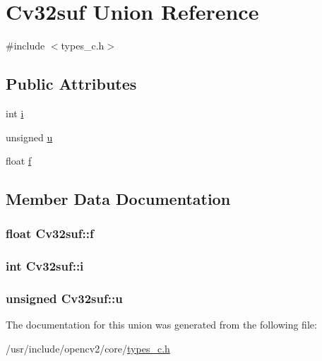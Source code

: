 \hypertarget{unionCv32suf}{\section{Cv32suf Union Reference}
\label{unionCv32suf}
}


{\ttfamily \#include $<$types\-\_\-c.\-h$>$}

\subsection*{Public Attributes}
\begin{DoxyCompactItemize}
\item 
int \hyperlink{unionCv32suf_a424508ebe407f2e67376ddfca524d16f}{i}
\item 
unsigned \hyperlink{unionCv32suf_a37ce47860a0ae3d46f607bd47bc28007}{u}
\item 
float \hyperlink{unionCv32suf_a89f398e11fc2af45eb6553e8b0a0fd18}{f}
\end{DoxyCompactItemize}


\subsection{Member Data Documentation}
\hypertarget{unionCv32suf_a89f398e11fc2af45eb6553e8b0a0fd18}{
\subsubsection[{f}]{\setlength{\rightskip}{0pt plus 5cm}float Cv32suf\-::f}}\label{unionCv32suf_a89f398e11fc2af45eb6553e8b0a0fd18}
\hypertarget{unionCv32suf_a424508ebe407f2e67376ddfca524d16f}{
\subsubsection[{i}]{\setlength{\rightskip}{0pt plus 5cm}int Cv32suf\-::i}}\label{unionCv32suf_a424508ebe407f2e67376ddfca524d16f}
\hypertarget{unionCv32suf_a37ce47860a0ae3d46f607bd47bc28007}{
\subsubsection[{u}]{\setlength{\rightskip}{0pt plus 5cm}unsigned Cv32suf\-::u}}\label{unionCv32suf_a37ce47860a0ae3d46f607bd47bc28007}


The documentation for this union was generated from the following file\-:\begin{DoxyCompactItemize}
\item 
/usr/include/opencv2/core/\hyperlink{core_2types__c_8h}{types\-\_\-c.\-h}\end{DoxyCompactItemize}

